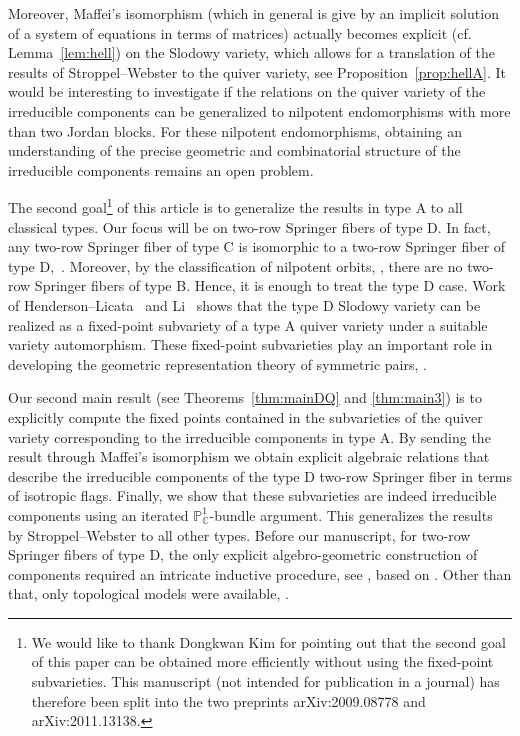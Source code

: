\documentclass[11pt,reqno]{amsart}
\numberwithin{equation}{section}
\theoremstyle{definition}
\newcommand{\CP}{\mathbb{P}_\mathbb{C}}
\begin{document}
Moreover, Maffei's isomorphism (which in general is give by an implicit solution of a system of equations in terms of matrices) actually becomes explicit (cf. Lemma~\ref{lem:hell}) on the Slodowy variety, which allows for a translation of the results of Stroppel--Webster to the quiver variety, see Proposition~\ref{prop:hellA}. 
It would be interesting to investigate if the relations on the quiver variety of the irreducible components can be generalized to nilpotent endomorphisms with more than two Jordan blocks. For these nilpotent endomorphisms, obtaining an understanding of the precise geometric and combinatorial structure of the irreducible components remains an open problem.     
 

The second goal\footnote{We would like to thank Dongkwan Kim for pointing out that the second goal of this paper can be obtained more efficiently without using the fixed-point subvarieties. This manuscript (not intended for publication in a journal) has therefore been split  into the two preprints arXiv:2009.08778 and arXiv:2011.13138.} of this article is to generalize the results in type A to all classical types. Our focus will be on two-row Springer fibers of type D. In fact, any two-row Springer fiber of type C is isomorphic to a two-row Springer fiber of type D,~\cite{Wil18, Li19}. Moreover, by the classification of nilpotent orbits, \cite{Wi37, Ger61}, there are no two-row Springer fibers of type B. Hence, it is enough to treat the type D case. Work of Henderson--Licata~\cite{HL14} and Li~\cite{Li19} shows that the type D Slodowy variety can be realized as a fixed-point subvariety of a type A quiver variety under a suitable variety automorphism. These fixed-point subvarieties play an important role in developing the geometric representation theory of symmetric pairs, \cite{Li19}. 

Our second main result (see Theorems~\ref{thm:mainDQ} and \ref{thm:main3}) is to explicitly compute the fixed points contained in the subvarieties of the quiver variety corresponding to the irreducible components in type A. By sending the result through Maffei's isomorphism we obtain explicit algebraic relations that describe the irreducible components of the type D two-row Springer fiber in terms of isotropic flags. 
Finally, we show that these subvarieties are indeed irreducible components using an iterated $\CP^1$-bundle argument.
This generalizes the results by Stroppel--Webster to all other types. 
Before our manuscript, for two-row Springer fibers of type D, 
the only explicit algebro-geometric construction of components required an intricate inductive procedure, see \cite[\S 6]{ES16}, based on \cite{Spa82, vL89}.
Other than that, only topological models were available, \cite{ES16, Wil18}.
\end{document}

